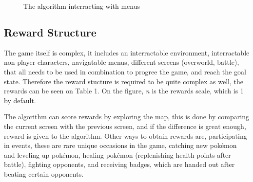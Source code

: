 \documentclass{article}
\begin{document}
\begin{figure}
    \centering
    \qquad
    \caption{The algorithm interracting with menus}%
    \label{fig:menu}%
\end{figure}

\subsection{Reward Structure}
	The game itself is complex, it includes an interractable environment, interractable non-player characters, navigatable menus, different screens (overworld, battle), that all needs to be used in combination to progree the game, and reach the goal state. Therefore the reward stucture is required to be quite complex as well, the rewards can be seen on Table 1. On the figure, {\it n} is the rewards scale, which is 1 by default.

The algorithm can score rewards by exploring the map, this is done by comparing the current screen with the previous screen, and if the difference is great enough, reward is given to the algorithm. Other ways to obtain rewards are, participating in events, these are rare unique occasions in the game, catching new pokémon and leveling up pokémon, healing pokémon (replenishing health points after battle), fighting opponents, and receiving badges, which are handed out after beating certain opponents.
\end{document}
